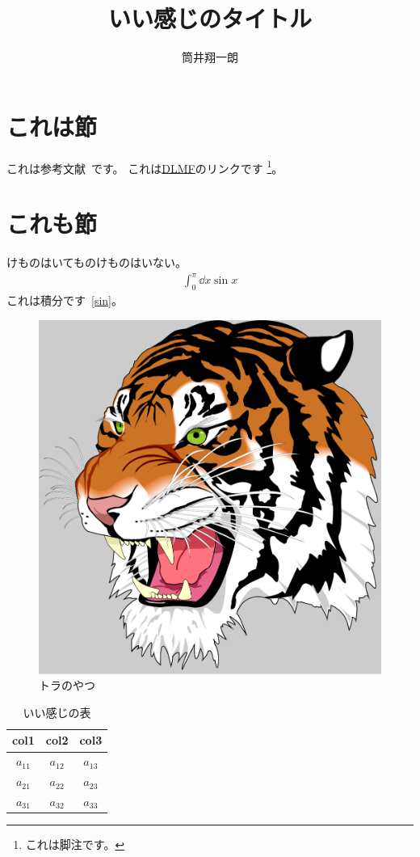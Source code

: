 \documentclass{ltjsarticle}
\begin{document}
\title{いい感じのタイトル}
\author{筒井翔一朗}

\maketitle
\tableofcontents

\section{これは節}
これは参考文献~\cite{Hubbard.PhysRevLett.3.77}です。
これは\href{https://dlmf.nist.gov/}{DLMF}のリンクです
\footnote{
     これは脚注です。
}。

\section{これも節}
けものはいてものけものはいない。
\begin{align}
     \int_0^\pi \dd{x} \sin x  \label{sin}
\end{align}
これは積分です~\eqref{sin}。
\begin{figure}[b]
     \centering
     \includegraphics[width=0.5\linewidth]{tiger}
     \caption{トラのやつ}
\end{figure}

\begin{table}[htb]
	\centering
	\begin{tabular}{ccc} \hline
          col1 & col2 & col3 \\ \hline
          $a_{11}$ & $a_{12}$ & $a_{13}$ \\
          $a_{21}$ & $a_{22}$ & $a_{23}$ \\
          $a_{31}$ & $a_{32}$ & $a_{33}$ \\ \hline
	\end{tabular}
	\caption{いい感じの表}
\end{table}





\end{document}
